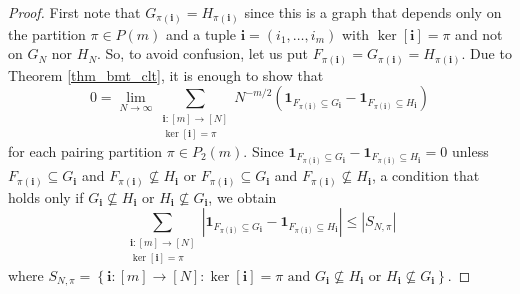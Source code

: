\documentclass[a4paper,12pt]{extarticle}
\theoremstyle{definition}
\theoremstyle{remark}
\newcommand{\abs}[1]{\left\vert {#1} \right\vert}
\begin{document}
\begin{proof}
	First note that $G_{\pi(\bm{i})} = H_{\pi(\bm{i})}$ since this is a graph that depends only on the partition $\pi \in P(m)$ and a tuple $\bm{i}=(i_1,\ldots,i_m)$ with $\ker[\bm{i}] = \pi$ and not on $G_N$ nor $H_N$.
	So, to avoid confusion, let us put $F_{\pi(\bm{i})}= G_{\pi(\bm{i})}= H_{\pi(\bm{i})}$. 
	Due to Theorem \ref{thm_bmt_clt}, it is enough to show that 
	\[
	0 = \lim_{N \to \infty}
	\sum_{\substack{ {\bm i}:[m]\rightarrow [N] \\ \ker[{\bm i}]=\pi}} 
	N^{-m/2} \left( 
	\bm{1}_{F_{\pi(\bm{i})}  \subseteq G_{\bm i}}   - 
	\bm{1}_{F_{\pi(\bm{i})}  \subseteq H_{\bm i}}  \right)
	\]
	for each pairing partition $\pi \in P_2(m)$. 
	Since $\bm{1}_{F_{\pi(\bm{i})}  \subseteq G_{\bm i}} -	\bm{1}_{F_{\pi(\bm{i})}  \subseteq H_{\bm i}} = 0$ unless $F_{\pi(\bm{i})}  \subseteq G_{\bm i}  $ and $F_{\pi(\bm{i}) } \not\subseteq H_{\bm i}  $ or  $F_{\pi(\bm{i})}  \subseteq G_{\bm i} $ and $F_{\pi(\bm{i}) } \not\subseteq H_{\bm i}$, 
	a condition that holds only if $G_{\bm i} \not\subseteq H_{\bm i}$ or $H_{\bm i} \not\subseteq G_{\bm i}$, we obtain 
	\[
	\sum_{\substack{ {\bm i}:[m]\rightarrow [N] \\ \ker[{\bm i}]=\pi}} 
	\abs{\bm{1}_{F_{\pi(\bm{i})}  \subseteq G_{\bm i}} -	\bm{1}_{F_{\pi(\bm{i})}  \subseteq H_{\bm i}}} 
	\leq 
	\abs{S_{N,\pi}} 
	\]
	where ${S}_{N,\pi} =
	\left\{ \bm{i}:[m]\rightarrow[N] : \ker[\bm{i}] = \pi \text{ and } G_{\bm i} \not\subseteq H_{\bm i} \text{ or } H_{\bm i} \not\subseteq G_{\bm i} \right\}.$
	

\end{proof}
\end{document}
